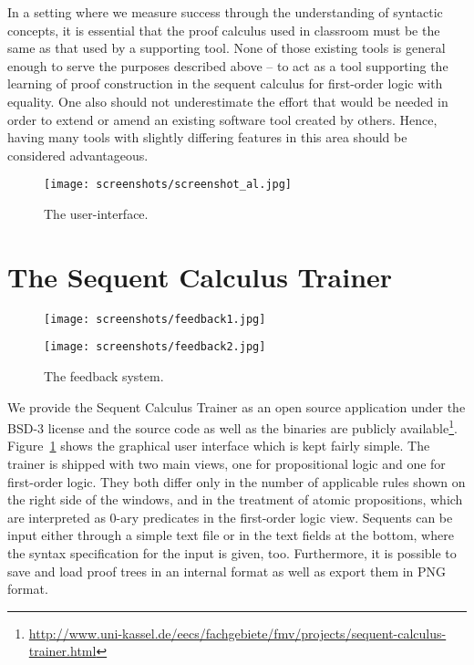 \documentclass[a4paper,UKenglish]{lipics}
\begin{document}
In a setting where we measure success through the understanding of syntactic concepts, it is essential that the proof calculus used in classroom must
be the same as that used by a supporting tool. None of those existing tools is general enough to serve the purposes described above -- to act as a tool
supporting the learning of proof construction in the sequent calculus for first-order logic with equality. One also should not underestimate the effort 
that would be needed in order to extend or amend an existing software tool created by others. Hence, having many tools with slightly differing features
in this area should be considered advantageous.

\begin{figure}
\begin{center}
\texttt{[image: screenshots/screenshot\_al.jpg]}
\caption{The user-interface.}\label{ui}
\end{center}
\end{figure}

\section{The Sequent Calculus Trainer}
\begin{figure}[!t]
\begin{center}
\texttt{[image: screenshots/feedback1.jpg]}

\vspace*{0.8em}
\texttt{[image: screenshots/feedback2.jpg]}
\caption{The feedback system.}\label{feedback}
\end{center}
\end{figure}
We provide the Sequent Calculus Trainer as an open source application under the BSD-3 license and the source code as well as the binaries are publicly
available\footnote{\url{http://www.uni-kassel.de/eecs/fachgebiete/fmv/projects/sequent-calculus-trainer.html}}. Figure~\ref{ui} shows the graphical user interface which is kept fairly
simple. The trainer is shipped with two main views, one for propositional logic and one for first-order logic. They both differ only in the number of
applicable rules shown on the right side of the windows, and in the treatment of atomic propositions, which are interpreted as 0-ary predicates in the first-order logic view. Sequents can be input either through a simple text file or in the text fields at the bottom,
where the syntax specification for the input is given, too. Furthermore, it is possible to save and load proof trees in an internal format as well as
export them in PNG format.
\end{document}
